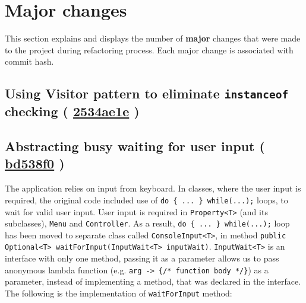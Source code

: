 \documentclass{article}
\renewcommand{\b}[1]{\textbf{#1}}
\newcommand{\code}[1]{\texttt{#1}}
\newcommand{\gh}[1]{%
  \href{https://github.com/awave1/assessment-loan-system/commit/#1}{#1}%
}
\begin{document}
\newpage

\section*{Major changes}

This section explains and displays the number of \b{major} changes that were made to the project during refactoring process. Each major change is associated with commit hash.

\subsection*{Using Visitor pattern to eliminate \code{instanceof} checking (\gh{2534ae1e})}






\subsection*{Abstracting busy waiting for user input (\gh{bd538f0})}
The application relies on input from keyboard. In classes, where the user input is required, the original code included use of \code{do \{ ... \} while(...);} loops, to wait for valid user input. User input is required in \code{Property<T>} (and its subclasses), \code{Menu} and \code{Controller}. As a result, \code{do \{ ... \} while(...);} loop has been moved to separate class called \code{ConsoleInput<T>}, in method \code{public Optional<T> waitForInput(InputWait<T> inputWait)}. \code{InputWait<T>} is an interface with only one method, passing it as a parameter allows us to pass anonymous lambda function (e.g. \code{arg -> \{/* function body */\}}) as a parameter, instead of implementing a method, that was declared in the interface. The following is the implementation of \code{waitForInput} method:
\end{document}

